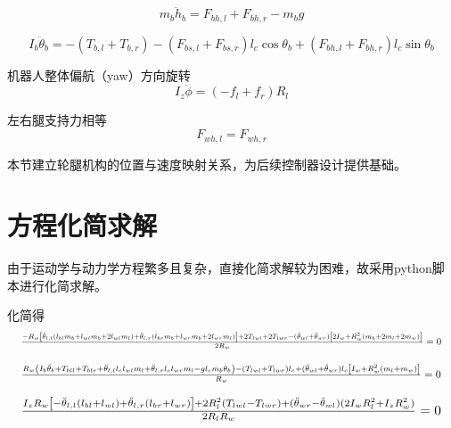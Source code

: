 \documentclass[
  oneside,
  degree=bachelor,
  fullwidthstop=false,
  fontset=fandol,
  times=false,
  minted=true,
  biblatex=true,
]{tongjithesis}
\begin{document}
\begin{equation}
m_b \ddot{h}_b = F_{bh,l} + F_{bh,r} - m_b g 
\end{equation}

\begin{equation}
I_b \ddot{\theta}_b = -(T_{b,l} + T_{b,r}) - (F_{bs,l} + F_{bs,r}) l_c \cos\theta_b + (F_{bh,l} + F_{bh,r}) l_c \sin\theta_b
\end{equation}

机器人整体偏航（yaw）方向旋转
\begin{equation}
I_z \ddot{\phi} = (-f_l + f_r) R_l 
\end{equation}

左右腿支持力相等
\begin{equation}
F_{wh,l} = F_{wh,r} 
\end{equation}

本节建立轮腿机构的位置与速度映射关系，为后续控制器设计提供基础。

\section{方程化简求解}
由于运动学与动力学方程繁多且复杂，直接化简求解较为困难，故采用python脚本进行化简求解。

化简得
\begin{equation}
\resizebox{0.98\linewidth}{!}{$
\frac{-R_w \left[ \ddot{\theta}_{l,l} (l_{bl} m_b + l_{wl} m_b + 2l_{wl} m_l) + \ddot{\theta}_{l,r} (l_{br} m_b + l_{wr} m_b + 2l_{wr} m_l) \right] + 2T_{lwl} + 2T_{lwr} - (\ddot{\theta}_{wl} + \ddot{\theta}_{wr}) \left[ 2I_w + R_w^2 (m_b + 2m_l + 2m_w) \right]}{2R_w} = 0
$}
\label{eq:x_y_move}
\end{equation}

\begin{equation}
\resizebox{0.98\linewidth}{!}{$
\frac{R_w \left( I_b \ddot{\theta}_b + T_{bll} + T_{blr} + \ddot{\theta}_{l,l} l_c l_{wl} m_l + \ddot{\theta}_{l,r} l_c l_{wr} m_l - g l_c m_b \theta_b \right) - (T_{lwl} + T_{lwr}) l_c + (\ddot{\theta}_{wl} + \ddot{\theta}_{wr}) l_c \left[ I_w + R_w^2 (m_l + m_w) \right]}{R_w} = 0
$}
\label{eq:pitch_move}
\end{equation}

\begin{equation}
\resizebox{0.98\linewidth}{!}{$
\frac{I_z R_w \left[ -\ddot{\theta}_{l,l}(l_{bl} + l_{wl}) + \ddot{\theta}_{l,r}(l_{br} + l_{wr}) \right] + 2R_l^2 (T_{lwl} - T_{lwr}) + (\ddot{\theta}_{wr} - \ddot{\theta}_{wl}) (2I_w R_l^2 + I_z R_w^2)}{2R_l R_w} = 0
$}
\label{eq:yaw_move}
\end{equation}
\end{document}
